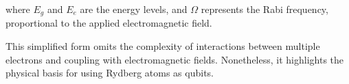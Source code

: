 \documentclass{article}
\begin{document}
\begin{multicols}{2}
where \( E_g \) and \( E_e \) are the energy levels, and \( \Omega \) represents the Rabi frequency, proportional to the applied electromagnetic field.

This simplified form omits the complexity of interactions between multiple electrons and coupling with electromagnetic fields. Nonetheless, it highlights the physical basis for using Rydberg atoms as qubits.














\end{multicols}
\end{document}
